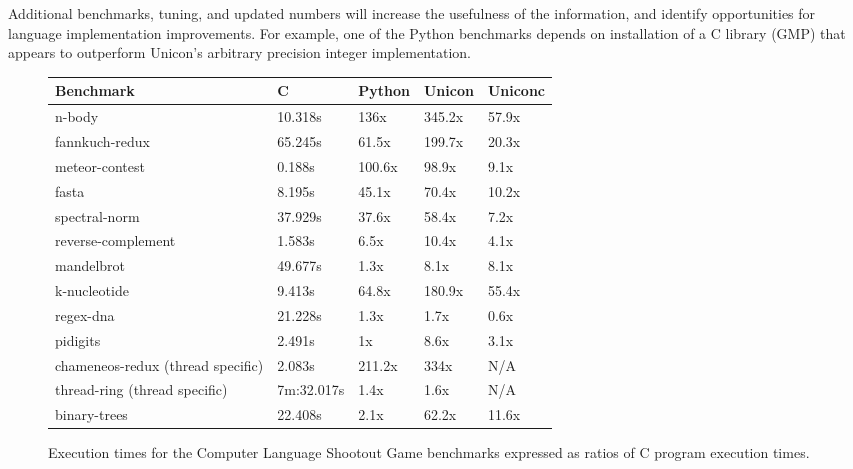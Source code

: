 \documentclass[letterpaper,12pt]{article}
\newcommand{\squeezeup}{\vspace{-1em}}
\begin{document}
Additional benchmarks, tuning, and updated numbers will
increase the usefulness of the information, and identify opportunities
for language implementation improvements. For example, one of the
Python benchmarks depends on installation of a C library (GMP) that
appears to outperform Unicon's arbitrary precision integer
implementation.

\begin{figure}[h]
  \begin{center}
    {\footnotesize
      \begin{tabularx}{.63\textwidth}{ | p{2.5cm} | p{1.7cm} | p{1.3cm} | p{1.3cm} | X |}
        \hline
        Benchmark & 
        C & 
        Python & 
        Unicon &
        Uniconc
        \\ \hline
        n-body &
        10.318s &
        136x &
        345.2x &
        57.9x 
        \\ \hline
        fannkuch-redux &
        65.245s &
        61.5x &
        199.7x &
        20.3x 
        \\ \hline
        meteor-contest &
        0.188s &
        100.6x &
        98.9x &
        9.1x
        \\ \hline
        fasta &
        8.195s &
        45.1x &
        70.4x &
        10.2x 
        \\ \hline
        spectral-norm &
        37.929s &
        37.6x &
        58.4x &
        7.2x 
        \\ \hline
        reverse-complement &
        1.583s &
        6.5x &
        10.4x &
        4.1x
        \\ \hline
        mandelbrot &
        49.677s &
        1.3x &
        8.1x &
        8.1x
        \\ \hline
        k-nucleotide &
        9.413s &
        64.8x &
        180.9x &
        55.4x
        \\ \hline
        regex-dna &
        21.228s &
        1.3x &
        1.7x &
        0.6x
        \\ \hline
        pidigits &
        2.491s &
        1x &
        8.6x &
        3.1x
        \\ \hline
        chameneos-redux \newline (thread specific) &
        2.083s &
        211.2x &
        334x &
        N/A
        \\ \hline
        thread-ring \newline (thread specific) &
        7m:32.017s &
        1.4x &
        1.6x &
        N/A
        \\ \hline
        binary-trees &
        22.408s &
        2.1x &
        62.2x &
        11.6x
        \\ \hline
      \end{tabularx}
    }
    \vspace{-4mm}
  \end{center}
  \caption{Execution times for the Computer Language Shootout
    Game benchmarks expressed as ratios of C program execution times.}
  \label{fig3}
  \squeezeup
\end{figure}
\end{document}
